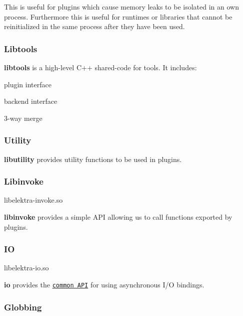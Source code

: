 This is useful for plugins which cause memory leaks to be isolated in an own process. Furthermore this is useful for runtimes or libraries that cannot be reinitialized in the same process after they have been used.

\subsubsection*{Libtools}

{\bfseries libtools} is a high-\/level C++ shared-\/code for tools. It includes\+:


\begin{DoxyItemize}
\item plugin interface
\item backend interface
\item 3-\/way merge
\end{DoxyItemize}

\subsubsection*{Utility}

{\bfseries libutility} provides utility functions to be used in plugins.

\subsubsection*{Libinvoke}


\begin{DoxyCode}
libelektra-invoke.so
\end{DoxyCode}


{\bfseries libinvoke} provides a simple A\+PI allowing us to call functions exported by plugins.

\subsubsection*{IO}


\begin{DoxyCode}
libelektra-io.so
\end{DoxyCode}


{\bfseries io} provides the \href{https://doc.libelektra.org/api/current/html/group__kdbio.html}{\tt common A\+PI} for using asynchronous I/O bindings.

\subsubsection*{Globbing}


